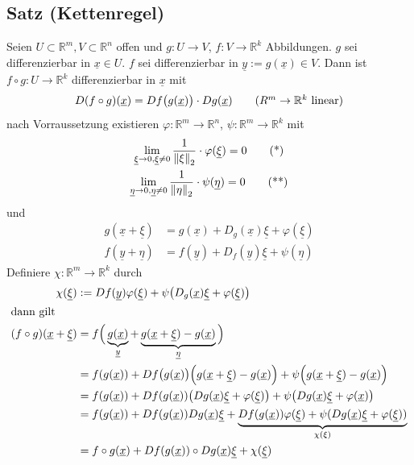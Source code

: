 \subsection[Satz: Kettenregel]{Satz (Kettenregel)} %
\label{sub:76}
Seien $U \subset \mathds{R}^m, V \subset \mathds{R}^n$ offen und $g : U \to V$, $f : V \to \mathds{R}^k$ Abbildungen. $g$ sei differenzierbar in $\underline{x} \in U$.
$f$ sei differenzierbar in $\underline{y} := g(\underline{x}) \in V$. Dann ist $f \circ g : U \to \mathds{R}^k$ differenzierbar in $\underline{x}$ mit 
\[
	D( f \circ g) (\underline{x}) = D f \big(g (\underline{x})\big) \cdot D g(\underline{x}) \tag{$R^m \to \mathds{R}^k$ linear}
\] 
nach Vorraussetzung existieren $\varphi : \mathds{R}^m \to \mathds{R}^n$, $\psi : \mathds{R}^m \to \mathds{R}^k$ mit 
\begin{gather*}
	\lim_{ \underline{\xi}   \to 0, \underline{\xi} \not= 0} \frac{1}{\norm[2]{\xi} }  \cdot \varphi( \underline{\xi} ) = 0 \tag{*}\\
	\lim_{ \underline{\eta}   \to 0, \underline{\eta} \not= 0} \frac{1}{\norm[2]{\eta} }  \cdot \psi( \underline{\eta} ) = 0 \tag{**}
\end{gather*}
und 
\begin{align*}
	g ( \underline{x} + \underline{\xi}  ) &= g (\underline{x} ) + D_g (\underline{x} )\underline{\xi} + \varphi ( \underline{\xi} ) \\
	f ( \underline{y} + \underline{\eta}  ) &= f (\underline{y} ) + D_f (\underline{y} )\underline{\xi} + \psi ( \underline{\eta} ) 
\end{align*}
Definiere $\chi : \mathds{R}^m \to \mathds{R}^k$ durch
\begin{align*}
	\chi ( \underline{\xi} ) &:= D f (\underline{y} ) \varphi( \underline{\xi} ) + \psi \big( D_g (\underline{x} ) \underline{\xi} + \varphi (\underline{\xi} ) \big) \\
	\intertext{dann gilt} (f \circ g) ( \underline{x} + \underline{\xi} ) &=  f \Big( \underbrace{g (\underline{x} )}_{\underline{y} } + \underbrace{g ( \underline{x} + \underline{\xi}  ) 
	- g (\underline{x} )}_{\underline{\eta} }  \Big) \\
	&= f ( g (\underline{x} )) + D f \big(g(\underline{x} )\big) \Big( g (\underline{x} + \underline{\xi}  ) - g(\underline{x} )  \Big) + 
	\psi  \Big( g (\underline{x} + \underline{\xi}  ) - g( \underline{x} )  \Big) \\
	&= f (g(\underline{x} )) + D f (g (\underline{x} ))  \enbrace*{D g (\underline{x} ) \underline{\xi} + \varphi (\underline{\xi} ) } + 
	\psi \big(  D g (\underline{x} ) \underline{\xi} + \varphi(\underline{x} )   \big) \\
	&= f(g(\underline{x} )) + D f(g(\underline{x} )) D g(\underline{x} ) \underline{\xi} + \underbrace{D f(g(\underline{x} )) \varphi(\underline{\xi} ) + 
	\psi ( D g(\underline{x} ) \underline{\xi} + \varphi(\underline{\xi} )) }_{\chi (\xi)} \\
	&= f \circ g (\underline{x} )  + D f( g(\underline{x} )) \circ D g(\underline{x} ) \underline{\xi} + \chi (\underline{\xi} ) 
\end{align*}
